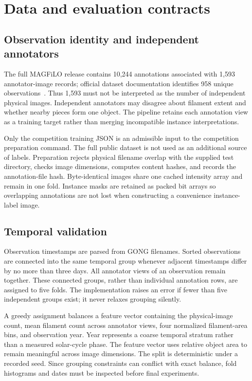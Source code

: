 \documentclass[conference]{IEEEtran}
\begin{document}
\section{Data and evaluation contracts}
\subsection{Observation identity and independent annotators}
The full MAGFiLO release contains 10,244 annotations associated with 1,593 annotator-image records; official dataset documentation identifies 958 unique observations~\cite{magfiloweb}. Thus 1,593 must not be interpreted as the number of independent physical images. Independent annotators may disagree about filament extent and whether nearby pieces form one object. The pipeline retains each annotation view as a training target rather than merging incompatible instance interpretations.

Only the competition training JSON is an admissible input to the competition preparation command. The full public dataset is not used as an additional source of labels. Preparation rejects physical filename overlap with the supplied test directory, checks image dimensions, computes content hashes, and records the annotation-file hash. Byte-identical images share one cached intensity array and remain in one fold. Instance masks are retained as packed bit arrays so overlapping annotations are not lost when constructing a convenience instance-label image.

\subsection{Temporal validation}
Observation timestamps are parsed from GONG filenames. Sorted observations are connected into the same temporal group whenever adjacent timestamps differ by no more than three days. All annotator views of an observation remain together. These connected groups, rather than individual annotation rows, are assigned to five folds. The implementation raises an error if fewer than five independent groups exist; it never relaxes grouping silently.

A greedy assignment balances a feature vector containing the physical-image count, mean filament count across annotator views, four normalized filament-area bins, and observation year. Year represents a coarse temporal stratum rather than a measured solar-cycle phase. The feature vector uses relative object area to remain meaningful across image dimensions. The split is deterministic under a recorded seed. Since grouping constraints can conflict with exact balance, fold histograms and dates must be inspected before final experiments.
\end{document}
